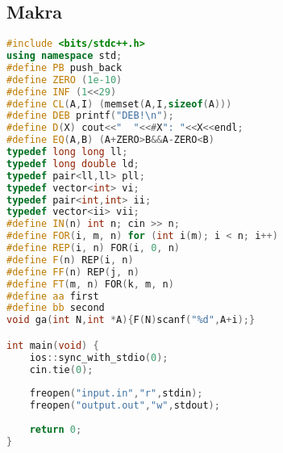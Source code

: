 \documentclass[11pt]{article}
\begin{document}
\subsection{Makra}
\begin{lstlisting}[language=C++]
#include <bits/stdc++.h>
using namespace std;
#define PB push_back
#define ZERO (1e-10)
#define INF (1<<29)
#define CL(A,I) (memset(A,I,sizeof(A)))
#define DEB printf("DEB!\n");
#define D(X) cout<<"  "<<#X": "<<X<<endl;
#define EQ(A,B) (A+ZERO>B&&A-ZERO<B)
typedef long long ll;
typedef long double ld;
typedef pair<ll,ll> pll;
typedef vector<int> vi;
typedef pair<int,int> ii;
typedef vector<ii> vii;
#define IN(n) int n; cin >> n;
#define FOR(i, m, n) for (int i(m); i < n; i++)
#define REP(i, n) FOR(i, 0, n)
#define F(n) REP(i, n)
#define FF(n) REP(j, n)
#define FT(m, n) FOR(k, m, n)
#define aa first
#define bb second
void ga(int N,int *A){F(N)scanf("%d",A+i);}

int main(void) {
    ios::sync_with_stdio(0);
    cin.tie(0);    
    
    freopen("input.in","r",stdin);
    freopen("output.out","w",stdout);    
    
    return 0;
}
\end{lstlisting}
\end{document}
